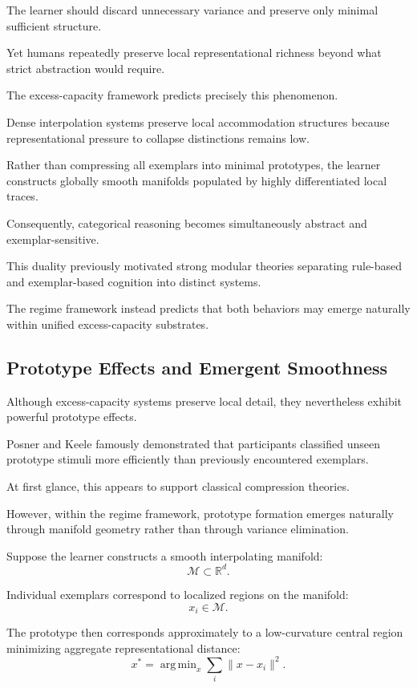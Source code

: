 \documentclass[12pt,a4paper]{article}
\DeclareMathOperator*{\argmin}{arg\,min}
\begin{document}
The learner should discard unnecessary variance and preserve only minimal sufficient structure.

Yet humans repeatedly preserve local representational richness beyond what strict abstraction would require.

The excess-capacity framework predicts precisely this phenomenon.

Dense interpolation systems preserve local accommodation structures because representational pressure to collapse distinctions remains low.

Rather than compressing all exemplars into minimal prototypes, the learner constructs globally smooth manifolds populated by highly differentiated local traces.

Consequently, categorical reasoning becomes simultaneously abstract and exemplar-sensitive.

This duality previously motivated strong modular theories separating rule-based and exemplar-based cognition into distinct systems.

The regime framework instead predicts that both behaviors may emerge naturally within unified excess-capacity substrates.

\subsection{Prototype Effects and Emergent Smoothness}

Although excess-capacity systems preserve local detail, they nevertheless exhibit powerful prototype effects.

Posner and Keele \cite{PosnerKeele1968} famously demonstrated that participants classified unseen prototype stimuli more efficiently than previously encountered exemplars.

At first glance, this appears to support classical compression theories.

However, within the regime framework, prototype formation emerges naturally through manifold geometry rather than through variance elimination.

Suppose the learner constructs a smooth interpolating manifold:
\[
\mathcal{M}
\subset
\mathbb{R}^d.
\]

Individual exemplars correspond to localized regions on the manifold:
\[
x_i \in \mathcal{M}.
\]

The prototype then corresponds approximately to a low-curvature central region minimizing aggregate representational distance:
\[
x^\ast
=
\argmin_x
\sum_i
\|x-x_i\|^2.
\]
\end{document}
